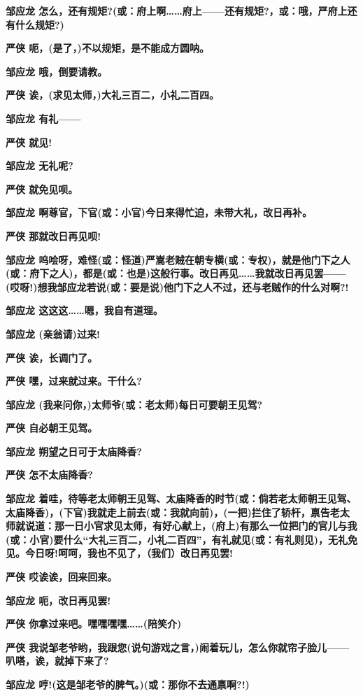 \textbf{邹应龙
怎么，还有规矩?(或：府上啊\ldots{}\ldots{}府上------还有规矩?，或：哦，严府上还有什么规矩?)}

\textbf{严侠 呃，(是了，)不以规矩，是不能成方圆呐。}

\textbf{邹应龙 哦，倒要请教。}

\textbf{严侠 诶，(求见太师，)大礼三百二，小礼二百四。}

\textbf{邹应龙 有礼------}

\textbf{严侠 就见!}

\textbf{邹应龙 无礼呢?}

\textbf{严侠 就免见呗。}

\textbf{邹应龙 啊尊官，下官(或：小官)今日来得忙迫，未带大礼，改日再补。}

\textbf{严侠 那就改日再见呗!}

\textbf{邹应龙
呜哙呀，难怪(或：怪道)严嵩老贼在朝专横(或：专权)，就是他门下之人(或：府下之人)，都是(或：也是)这般行事。改日再见\ldots{}\ldots{}我就改日再见罢------(哎呀!)想我邹应龙若说(或：要是说)他门下之人不过，还与老贼作的什么对啊?!}

\textbf{邹应龙 这这这\ldots{}\ldots{}嗯，我自有道理。}

\textbf{邹应龙 (亲翁请)过来!}

\textbf{严侠 诶，长调门了。}

\textbf{严侠 嘿，过来就过来。干什么?}

\textbf{邹应龙 (我来问你，)太师爷(或：老太师)每日可要朝王见驾?}

\textbf{严侠 自必朝王见驾。}

\textbf{邹应龙 朔望之日可于太庙降香?}

\textbf{严侠 怎不太庙降香?}

\textbf{邹应龙
着哇，待等老太师朝王见驾、太庙降香的时节(或：倘若老太师朝王见驾、太庙降香)，(下官)我就走上前去(或：我就向前)，(一把)拦住了轿杆，禀告老太师就说道：那一日小官求见太师，有好心献上，(府上)有那么一位把门的官儿与我(或：小官)要什么``大礼三百二，小礼二百四''，有礼就见(或：有礼则见)，无礼免见。今日呀!呵呵，我也不见了，（我们）改日再见罢!}

\textbf{严侠 哎诶诶，回来回来。}

\textbf{邹应龙 呃，改日再见罢!}

\textbf{严侠 你拿过来吧。嘿嘿嘿嘿\ldots{}\ldots{}(陪笑介)}

\textbf{严侠
我说邹老爷哟，我跟您(说句游戏之言，)闹着玩儿，怎么你就帘子脸儿------叭嗒，诶，就掉下来了?}

\textbf{邹应龙 哼!(这是邹老爷的脾气。)(或：那你不去通禀啊?!)}

